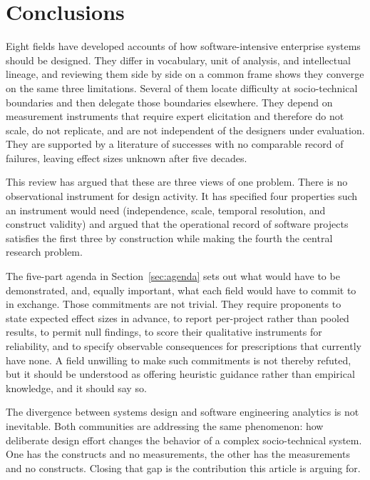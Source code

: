 \documentclass{csimq}
\begin{document}
\section{Conclusions}
\label{sec:conclusions}

Eight fields have developed accounts of how software-intensive enterprise
systems should be designed. They differ in vocabulary, unit of analysis, and
intellectual lineage, and reviewing them side by side on a common frame shows
they converge on the same three limitations. Several of them locate difficulty at
socio-technical boundaries and then delegate those boundaries elsewhere. They
depend on measurement instruments that require expert elicitation and therefore
do not scale, do not replicate, and are not independent of the designers under
evaluation. They are supported by a literature of successes with no comparable
record of failures, leaving effect sizes unknown after five decades.

This review has argued that these are three views of one problem. There is no
observational instrument for design activity. It has specified four properties
such an instrument would need (independence, scale, temporal resolution, and
construct validity) and argued that the operational record of software
projects satisfies the first three by construction while making the fourth the
central research problem.

The five-part agenda in Section~\ref{sec:agenda} sets out what would have to be
demonstrated, and, equally important, what each field would have to commit
to in exchange. Those commitments are not trivial. They require proponents to
state expected effect sizes in advance, to report per-project rather than pooled
results, to permit null findings, to score their qualitative instruments for
reliability, and to specify observable consequences for prescriptions that
currently have none. A field unwilling to make such commitments is not
thereby refuted, but it should be understood as offering heuristic guidance
rather than empirical knowledge, and it should say so.

The divergence between systems design and software engineering analytics is not
inevitable. Both communities are addressing the same phenomenon: how deliberate
design effort changes the behavior of a complex socio-technical system. One has
the constructs and no measurements, the other has the measurements and no
constructs. Closing that gap is the contribution this article is arguing for.



\end{document}
